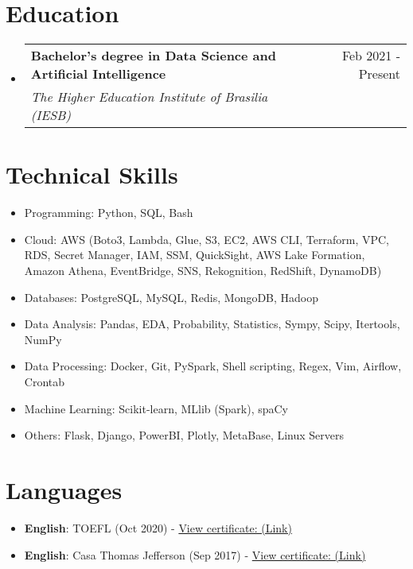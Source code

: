 \documentclass[letterpaper,11pt]{article}%
\makeatletter
\newcommand{\resumeSubheading}[4]{\vspace{-1pt}\item\begin{tabular*}{0.97\textwidth}[t]{l@{\extracolsep{\fill}}r}\textbf{#1} & #2 \\\textit{\small #3} & \textit{\small #4} \\\end{tabular*}\vspace{-8pt}}%
\newcommand{\resumeSubHeadingListStart}{\begin{itemize}[leftmargin=0.15in, label={}, itemsep=0pt, parsep=0pt]}%
\newcommand{\resumeSubHeadingListEnd}{\end{itemize}}%
\newcommand{\resumeItemListStart}{\begin{itemize}[itemsep=0pt, parsep=0pt]}%
\newcommand{\resumeItemListEnd}{\end{itemize}\vspace{-1pt}}%
\makeatother
\begin{document}
%
\section*{Education}%
\label{sec:Education}%
\resumeSubHeadingListStart%
\resumeSubheading{Bachelor’s degree in Data Science and Artificial Intelligence}{Feb 2021 - Present}{The Higher Education Institute of Brasilia (IESB)}{}%
\resumeSubHeadingListEnd

%
\section*{Technical Skills}%
\label{sec:TechnicalSkills}%
\begin{multicols}{2}%
\resumeItemListStart%
\item Programming: Python, SQL, Bash%
\item Cloud: AWS (Boto3, Lambda, Glue, S3, EC2, AWS CLI, Terraform, VPC, RDS, Secret Manager, IAM, SSM, QuickSight, AWS Lake Formation, Amazon Athena, EventBridge, SNS, Rekognition, RedShift, DynamoDB)%
\item Databases: PostgreSQL, MySQL, Redis, MongoDB, Hadoop%
\item Data Analysis: Pandas, EDA, Probability, Statistics, Sympy, Scipy, Itertools, NumPy%
\item Data Processing: Docker, Git, PySpark, Shell scripting, Regex, Vim, Airflow, Crontab%
\item Machine Learning: Scikit-learn, MLlib (Spark), spaCy%
\item Others: Flask, Django, PowerBI, Plotly, MetaBase, Linux Servers%
\resumeItemListEnd%
\end{multicols}

%
\section*{Languages}%
\label{sec:Languages}%
\begin{itemize}[leftmargin=0.15in, label={}]%
\item%
\textbf{English}: TOEFL (Oct 2020) - \href{https://github.com/s33ding/my_resume/blob/main/my_certificates/english_TOEFL_my_score.pdf}{View certificate: (Link)}%
\item%
\textbf{English}: Casa Thomas Jefferson (Sep 2017) - \href{https://github.com/s33ding/my_resume/blob/main/my_certificates/english_Casa%20Thomas%20Jefferson.pdf}{View certificate: (Link)}%
\end{itemize}

%
\end{document}
